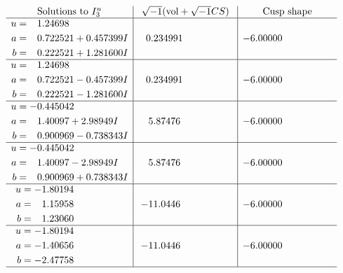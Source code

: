 \documentclass[1p]{elsarticle_modified}
\theoremstyle{definition}
\newcommand{\I}{\sqrt{-1}}
\begin{document}
$$\begin{array}{c|c|c}  
\text{Solutions to }I^u_{3}& \I (\text{vol} + \sqrt{-1}CS) & \text{Cusp shape}\\
 \hline 
\begin{aligned}
u &= \phantom{-}1.24698\phantom{ +0.000000I} \\
a &= \phantom{-}0.722521 + 0.457399 I \\
b &= \phantom{-}0.222521 + 1.281600 I\end{aligned}
 & \phantom{-}0.234991\phantom{ +0.000000I} & -6.00000\phantom{ +0.000000I} \\ \hline\begin{aligned}
u &= \phantom{-}1.24698\phantom{ +0.000000I} \\
a &= \phantom{-}0.722521 - 0.457399 I \\
b &= \phantom{-}0.222521 - 1.281600 I\end{aligned}
 & \phantom{-}0.234991\phantom{ +0.000000I} & -6.00000\phantom{ +0.000000I} \\ \hline\begin{aligned}
u &= -0.445042\phantom{ +0.000000I} \\
a &= \phantom{-}1.40097 + 2.98949 I \\
b &= \phantom{-}0.900969 - 0.738343 I\end{aligned}
 & \phantom{-}5.87476\phantom{ +0.000000I} & -6.00000\phantom{ +0.000000I} \\ \hline\begin{aligned}
u &= -0.445042\phantom{ +0.000000I} \\
a &= \phantom{-}1.40097 - 2.98949 I \\
b &= \phantom{-}0.900969 + 0.738343 I\end{aligned}
 & \phantom{-}5.87476\phantom{ +0.000000I} & -6.00000\phantom{ +0.000000I} \\ \hline\begin{aligned}
u &= -1.80194\phantom{ +0.000000I} \\
a &= \phantom{-}1.15958\phantom{ +0.000000I} \\
b &= \phantom{-}1.23060\phantom{ +0.000000I}\end{aligned}
 & -11.0446\phantom{ +0.000000I} & -6.00000\phantom{ +0.000000I} \\ \hline\begin{aligned}
u &= -1.80194\phantom{ +0.000000I} \\
a &= -1.40656\phantom{ +0.000000I} \\
b &= -2.47758\phantom{ +0.000000I}\end{aligned}
 & -11.0446\phantom{ +0.000000I} & -6.00000\phantom{ +0.000000I}\\
 \hline 
 \end{array}$$\newpage
\end{document}
